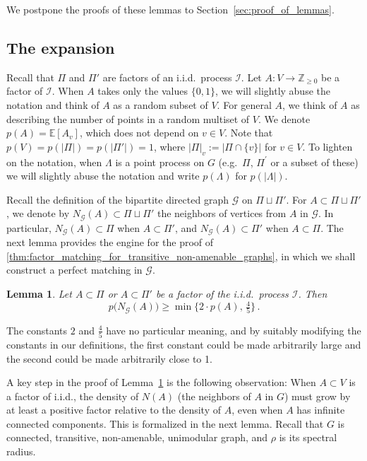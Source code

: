 \documentclass[11pt, reqno]{article}
\newtheorem{lemma}[thm]{Lemma}
\numberwithin{equation}{section}
\theoremstyle{definition}
\def\cI{\mathcal{I}}
\def\cG{\mathcal{G}}
\def\E{\mathbb{E}}
\def\Z{\mathbb{Z}}
\newcommand{\1}{\mathds{1}}
\begin{document}
We postpone the proofs of these lemmas to Section~\ref{sec:proof_of_lemmas}.

\subsection{The expansion}

Recall that $\Pi$ and $\Pi'$ are factors of an i.i.d.\ process $\cI$.
Let $A\colon V\to \Z_{\ge 0}$ be a factor of $\cI$. When $A$ takes only the values $\{0,1\}$, we will slightly abuse the notation and think of $A$ as a random subset of $V$. For general $A$, we think of $A$ as describing the number of points in a random multiset of $V$. We denote $p(A) = \E[A_v]$, which does not depend on $v\in V$. 
Note that $p(V)=p(|\Pi|)=p(|\Pi'|)=1$, where $|\Pi|_v := |\Pi \cap \{v\}|$ for $v\in V$. To lighten on the notation, when $\Lambda$ is a point process on $G$ (e.g.\ $\Pi$, $\Pi^\prime$ or a subset of these) we will slightly abuse the notation and write $p(\Lambda)$ for $p(|\Lambda|)$. 

Recall the definition of the bipartite directed graph $\cG$ on $\Pi\sqcup\Pi'$. For $A\subset \Pi\sqcup\Pi'$, we denote by $N_{\cG}(A) \subset \Pi\sqcup\Pi'$ the neighbors of vertices from $A$ in $\cG$. In particular, $N_{\cG}(A) \subset \Pi$ when $A \subset \Pi'$, and $N_{\cG}(A) \subset \Pi'$ when $A \subset \Pi$. The next lemma provides the engine for the proof of \cref{thm:factor_matching_for_transitive_non-amenable_graphs}, in which we shall construct a perfect matching in $\cG$. 
\begin{lemma}
    \label{lemma:boosted_hall}
    Let $A\subset \Pi$ or $A \subset \Pi'$ be a factor of the i.i.d.\ process $\cI$. Then
    \[
    p\big(N_\cG(A)\big) \ge \min\big\{2 \cdot p(A),\, \tfrac45 \big\} \, .
    \]
\end{lemma}
\noindent
The constants $2$ and $\frac45$ have no particular meaning, and by suitably modifying the constants in our definitions, the first constant could be made arbitrarily large and the second could be made arbitrarily close to 1.

A key step in the proof of Lemma~\ref{lemma:boosted_hall} is the following observation: When $A\subset V$ is a factor of i.i.d., the density of $N(A)$ (the neighbors of $A$ in $G$) must grow by at least a positive factor relative to the density of $A$, even when $A$ has infinite connected components. This is formalized in the next lemma. Recall that $G$ is connected, transitive, non-amenable, unimodular graph, and $\rho$ is its spectral radius.
\end{document}
